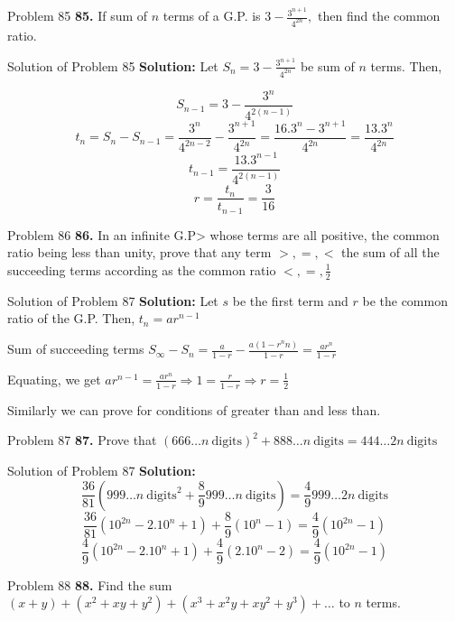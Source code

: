 \documentclass[aspectratio=1610,8pt]{beamer}
\begin{document}
\begin{frame}{Problem 85}
  \textbf{85.} If sum of $n$ terms of a G.P. is $3 - \frac{3^{n + 1}}{4^{2n}},$ then find the common ratio.
\end{frame}
\begin{frame}{Solution of Problem 85}
  \textbf{Solution:} Let $S_n =  3 - \frac{3^{n + 1}}{4^{2n}}$ be sum of $n$ terms. Then,

  $$S_{n - 1} = 3 - \frac{3^n}{4^{2(n - 1)}}$$
  $$t_n = S_n - S_{n - 1} = \frac{3^n}{4^{2{n - 2}}} - \frac{3^{n + 1}}{4^{2n}} = \frac{16.3^n - 3^{n + 1}}{4^{2n}} =
  \frac{13.3^{n}}{4^{2n}}$$
  $$t_{n - 1} = \frac{13.3^{n - 1}}{4^{2(n - 1)}}$$
  $$r = \frac{t_n}{t_{n - 1}} = \frac{3}{16}$$
\end{frame}
\begin{frame}{Problem 86}
  \textbf{86.} In an infinite G.P> whose terms are all positive, the common ratio being less than unity, prove that any term $>, =,
  <$ the sum of all the succeeding terms according as the common ratio $<, =, \frac{1}{2}$
\end{frame}
\begin{frame}{Solution of Problem 87}
  \textbf{Solution:} Let $s$ be the first term and $r$ be the common ratio of the G.P. Then, $t_n = ar^{n - 1}$

  Sum of succeeding terms $S_\infty - S_n = \frac{a}{1 - r} - \frac{a(1 - r^nn)}{1 - r} = \frac{ar^n}{1 - r}$

  Equating, we get $ar^{n - 1} = \frac{ar^n}{1 - r}\Rightarrow 1 = \frac{r}{1 - r}\Rightarrow r = \frac{1}{2}$

  Similarly we can prove for conditions of greater than and less than.
\end{frame}
\begin{frame}{Problem 87}
  \textbf{87.} Prove that $(666\ldots n~\text{digits})^2 + 888\ldots n~\text{digits} = 444\ldots 2n~\text{digits}$
\end{frame}
\begin{frame}{Solution of Problem 87}
  \textbf{Solution:} $$\frac{36}{81}(999\ldots n~\text{digits}^2 + \frac{8}{9}999\ldots n~\text{digits}) = \frac{4}{9}999\ldots
  2n~\text{digits}$$
  $$\frac{36}{81}(10^{2n} - 2.10^n + 1) + \frac{8}{9}(10^n - 1) = \frac{4}{9}(10^{2n} - 1)$$
  $$\frac{4}{9}(10^{2n} - 2.10^n + 1) + \frac{4}{9}(2.10^n - 2)= \frac{4}{9}(10^{2n} - 1)$$
\end{frame}
\begin{frame}{Problem 88}
  \textbf{88.} Find the sum $(x + y) + (x^2 + xy + y^2) + (x^3 + x^2y + xy^2 + y^3) + \ldots$ to $n$ terms.
\end{frame}
\end{document}
